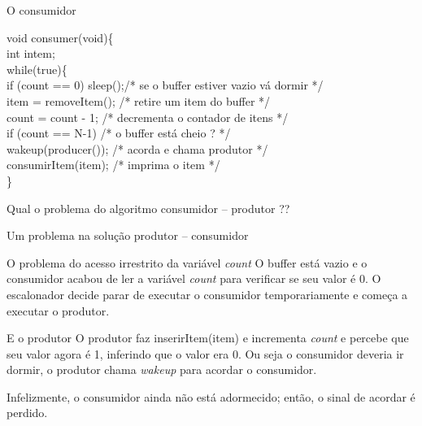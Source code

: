 \documentclass[11pt]{beamer}
\begin{document}
\begin{frame}{ O consumidor}
  \begin{algorithm}[H]
    
    void consumer(void)\{ \\
\hspace{0,2 cm}      int intem; \\
\vspace{0,3 cm}      
\hspace{0,2 cm} while(true)\{\\
\hspace{0,5 cm}	if (count == 0) sleep();/* se o buffer estiver vazio vá dormir */\\
\hspace{0,5 cm}	item = removeItem(); 	/* retire um item do buffer */\\
\hspace{0,5 cm}	count = count - 1;      /* decrementa o contador de itens */\\
\hspace{0,5 cm}	if (count == N-1) 	/* o buffer está cheio ? */\\
\hspace{0,7 cm} wakeup(producer());	/* acorda e chama produtor */\\
\hspace{0,5 cm}	consumirItem(item);	/* imprima o item */\\
\hspace{0,2 cm}    \}\\
  \end{algorithm}
  \pause
  Qual o problema do algoritmo consumidor -- produtor ??
\end{frame}


\begin{frame}{ Um problema na solução produtor -- consumidor}

\begin{block}{ O problema do acesso irrestrito da variável \textit{count}}
  O buffer está vazio e o consumidor acabou de ler a variável \textit{count} para verificar se seu valor é 0.
  \pause
  O escalonador decide parar de executar o consumidor temporariamente e começa a executar o produtor.
 \end{block}

 \pause
\begin{block}{ E o produtor}
 O produtor faz inserirItem(item) e incrementa \textit{count} e percebe que seu valor agora é 1, inferindo que o valor era 0.
 \pause
 Ou seja o consumidor deveria ir dormir, o produtor chama \textit{wakeup} para acordar o consumidor.
\end{block}
\pause
 Infelizmente, o consumidor ainda não está adormecido; então, o sinal de acordar é perdido.
\end{frame}
\end{document}
